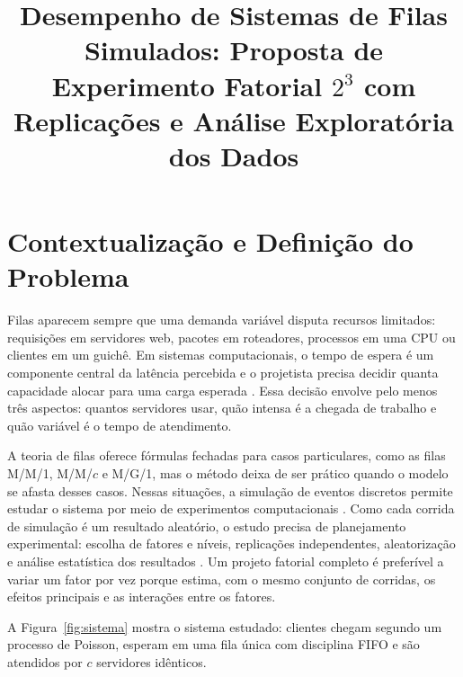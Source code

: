 \documentclass[stu,a4paper,12pt,floatsintext,biblatex]{apa7}
\title{Desempenho de Sistemas de Filas Simulados: Proposta de Experimento Fatorial \texorpdfstring{$2^3$}{2\textasciicircum 3} com Replicações e Análise Exploratória dos Dados}
\begin{document}
\maketitle

\section{Contextualização e Definição do Problema}
Filas aparecem sempre que uma demanda variável disputa recursos limitados: requisições em servidores web, pacotes em roteadores, processos em uma CPU ou clientes em um guichê.
Em sistemas computacionais, o tempo de espera é um componente central da latência percebida e o projetista precisa decidir quanta capacidade alocar para uma carga esperada \parencite{jain1991}.
Essa decisão envolve pelo menos três aspectos: quantos servidores usar, quão intensa é a chegada de trabalho e quão variável é o tempo de atendimento.

A teoria de filas oferece fórmulas fechadas para casos particulares, como as filas M/M/1, M/M/$c$ e M/G/1, mas o método deixa de ser prático quando o modelo se afasta desses casos.
Nessas situações, a simulação de eventos discretos permite estudar o sistema por meio de experimentos computacionais \parencite{law2000}.
Como cada corrida de simulação é um resultado aleatório, o estudo precisa de planejamento experimental: escolha de fatores e níveis, replicações independentes, aleatorização e análise estatística dos resultados \parencite{jain1991,montgomery2017}.
Um projeto fatorial completo é preferível a variar um fator por vez porque estima, com o mesmo conjunto de corridas, os efeitos principais e as interações entre os fatores.

A Figura~\ref{fig:sistema} mostra o sistema estudado: clientes chegam segundo um processo de Poisson, esperam em uma fila única com disciplina FIFO e são atendidos por $c$ servidores idênticos.
\end{document}
